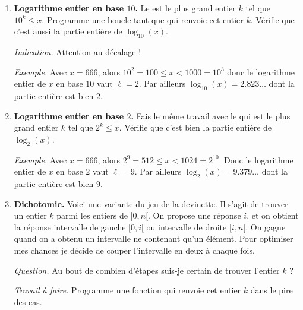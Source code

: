 \documentclass[11pt,class=report,crop=false]{standalone}
\begin{document}
\begin{activite}



  \begin{enumerate}
    \item \textbf{Logarithme entier en base $10$.}
    Le  est le plus grand entier $k$ tel que $10^k \le x$.
    Programme une boucle \og{}tant que\fg{} qui renvoie cet entier $k$.
    Vérifie que c'est aussi la partie entière de $\log_{10}(x)$.
    
    \emph{Indication.} Attention au décalage !  
      
    \emph{Exemple.} Avec $x = 666$, alors $10^2 = 100 \le x < 1000 = 10^3$ donc le logarithme entier de $x$ 
    en base $10$ vaut $\ell = 2$. Par ailleurs $\log_{10} (x) =  2.823\ldots$ dont la partie entière est bien $2$.

       
    \item \textbf{Logarithme entier en base $2$.}
    Fais le même travail avec le  qui est le plus grand entier $k$ tel que $2^k \le x$. Vérifie que c'est bien la partie entière de $\log_{2}(x)$.
  
  \emph{Exemple.} Avec $x = 666$, alors $2^9 = 512 \le x < 1024 = 2^{10}$. Donc le logarithme entier de $x$ en base $2$ vaut $\ell = 9$. Par ailleurs $\log_{2} (x) =  9.379\ldots$ dont la partie entière est bien $9$.
   
  \item \textbf{Dichotomie.} Voici une variante du jeu de la devinette. Il s'agit de trouver un entier $k$ parmi les entiers de $[0,n[$.
  On propose une réponse $i$, et on obtient la réponse \og{}intervalle de gauche $[0,i[$\fg{} ou \og{}intervalle de droite $[i,n[$\fg{}. On gagne quand on a obtenu un intervalle ne contenant qu'un élément. Pour optimiser mes chances je décide de couper l'intervalle en deux à chaque fois. 
  
   \bigskip   
   
  \emph{Question.} Au bout de combien d'étapes suis-je certain de trouver l'entier $k$ ?
 
  \bigskip  
  
  \emph{Travail à faire.} Programme une fonction  qui renvoie cet entier $k$ dans le pire des cas.
     

\end{enumerate}
\end{activite}
\end{document}
